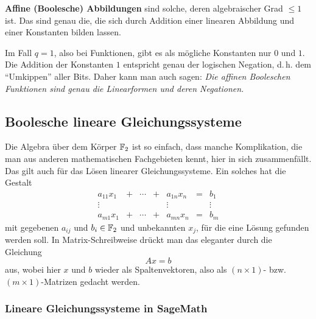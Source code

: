 \begin{refsegment}
{\bf Affine (Boolesche) Abbildungen} sind solche, deren algebraischer Grad
$\leq 1$ ist. Das sind genau die, die sich durch Addition einer linearen
Abbildung und einer Konstanten bilden lassen.

Im Fall $q = 1$, also bei Funktionen, gibt es als mögliche Konstanten nur $0$
und $1$. Die Addition der Konstanten $1$ entspricht genau der logischen
Negation, d.\,h. dem "`Umkippen"' aller Bits. Daher kann man auch sagen:
{\em Die affinen Booleschen Funktionen sind genau die Linearformen und
deren Negationen.}

\subsection{Boolesche lineare Gleichungssysteme}\label{ss-bool-lgl}

Die Algebra über dem Körper $\mathbb{F}_2$ ist so einfach, dass manche Komplikation,
die man aus anderen mathematischen Fachgebieten kennt, hier in sich zusammenfällt.
Das gilt auch für das Lösen linearer
Gleichungssysteme.
Ein solches hat die Gestalt
\[
\begin{matrix}
     a_{11} x_1 & + & \cdots & + & a_{1n} x_n & = & b_1 \\
     \vdots     &   &        &   & \vdots     &   & \vdots \\
     a_{m1} x_1 & + & \cdots & + & a_{mn} x_n & = & b_m
\end{matrix}
\]
mit gegebenen $a_{ij}$ und $b_i \in \mathbb{F}_2$ und unbekannten $x_j$, für
die eine Lösung gefunden werden soll. In Matrix-Schreibweise drückt
man das eleganter durch die Gleichung
\[
     A x = b
\]
aus, wobei hier $x$ und $b$ wieder als Spaltenvektoren, also als
$(n \times 1)$- bzw. $(m \times 1)$-Matrizen gedacht werden.

\subsubsection*{Lineare Gleichungssysteme in SageMath}


\end{refsegment}
